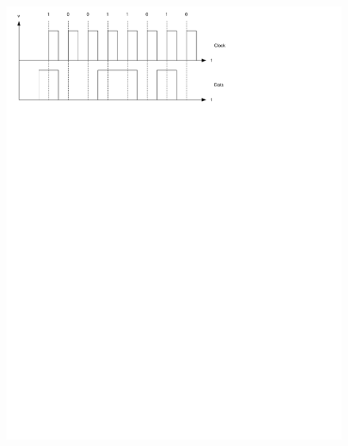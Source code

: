 \begin{figure}[ptb]
\begin{centering}
{			\includegraphics[width=6in]{SPI/Figures/spi-clocking_schemes_rise_delay.pdf}
			\label{fig:spi:clocking_schemes_rise_delay}
		}
		\label{fig:spi:clocking_schemes}
	\end{centering}
\end{figure}

